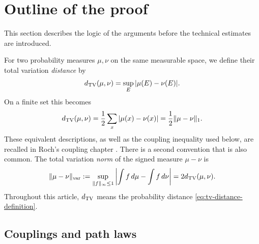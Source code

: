 \documentclass[11pt,a4paper]{amsart}
\theoremstyle{definition}
\theoremstyle{remark}
\numberwithin{equation}{section}
\newcommand{\dd}{\,d}
\newcommand{\1}{\boldsymbol 1}
\begin{document}
\section{Outline of the proof}
\label{sec:proof-comments}
This section describes the logic of the arguments before the technical estimates are introduced. 

For two probability measures $\mu,\nu$ on the same measurable space,
we define their total variation \emph{distance} by
\begin{equation}\label{eq:tv-distance-definition}
 d_{\rm TV}(\mu,\nu)=\sup_E|\mu(E)-\nu(E)|.
\end{equation}
On a finite set this becomes
\begin{equation}\label{eq:tv-finite}
 d_{\rm TV}(\mu,\nu)
 =\frac12\sum_x|\mu(x)-\nu(x)|
 =\frac12\|\mu-\nu\|_1.
\end{equation}
These equivalent descriptions, as well as the coupling inequality used
below, are recalled in Roch's coupling chapter
\cite[Lemmas~4.1.9 and~4.1.11]{Roch}.
There is a second convention that is also common.  The total variation
\emph{norm} of the signed measure $\mu-\nu$ is
\begin{equation}\label{eq:variation-norm}
 \|\mu-\nu\|_{\rm var}
 :=\sup_{\|f\|_\infty\le1}
   \left|\int f\dd\mu-\int f\dd\nu\right|
 =2d_{\rm TV}(\mu,\nu).
\end{equation}
Throughout this article, $d_{\rm TV}$ means the probability distance
\eqref{eq:tv-distance-definition}.

\subsection{Couplings and path laws}
\label{subsec:coupling-conventions}
\end{document}
